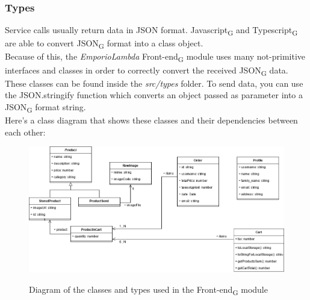 \subsubsection{Types}
Service calls usually return data in JSON format. Javascript\textsubscript{G} and Typescript\textsubscript{G} are able to convert JSON\textsubscript{G} format into a class object.\\
Because of this, the \textit{EmporioLambda} Front-end\textsubscript{G} module uses many not-primitive interfaces and classes in order to correctly convert the received JSON\textsubscript{G} data. These classes can be found inside the \textit{src/types} folder. To send data, you can use the JSON.stringify function which converts an object passed as parameter into a JSON\textsubscript{G} format string.\\Here's a class diagram that shows these classes and their dependencies between each other:
\vspace{0.5cm}
\begin{figure}[H]
\centering
\includegraphics[scale=0.45]{res/Architettura/Frontend/img/class_frontend_types}\\
\caption{Diagram of the classes and types used in the Front-end\textsubscript{G} module}
\end{figure}